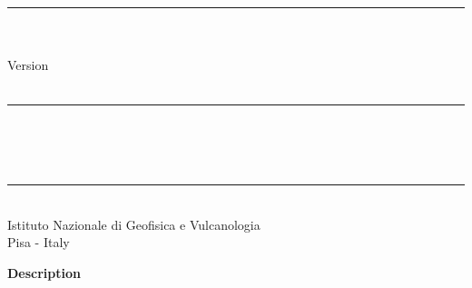 
\thispagestyle{empty}

\vspace*{0.3in}

\begin{centering}
  \rule{6in}{0.04in}				\\	\vspace{0.25in}
  {\Huge \PDAC\ \UGTITLE}			\\	\vspace{0.25in}
  {\Large Version \PDACVERSION}          	\\	\vspace{0.20in}
  {\Large \PDACNOTES}                    	\\	\vspace{0.20in}
  \rule{6in}{0.04in}				\\	\vspace{0.25in}
  {\Large \UGAUTHORS}				\\	\vspace{0.20in}
  \PDACDATE					\\	\vspace{0.20in}
  \rule{6in}{0.04in}				\\	\vspace{0.25in}
  {\large       Istituto Nazionale di Geofisica e Vulcanologia} \\ 
  {\large       Pisa - Italy}      \\ 
\end{centering}
\vspace{0.2in}

\begin{center}
  {\Large \bf Description}
\end{center}

\noindent \UGDESC

